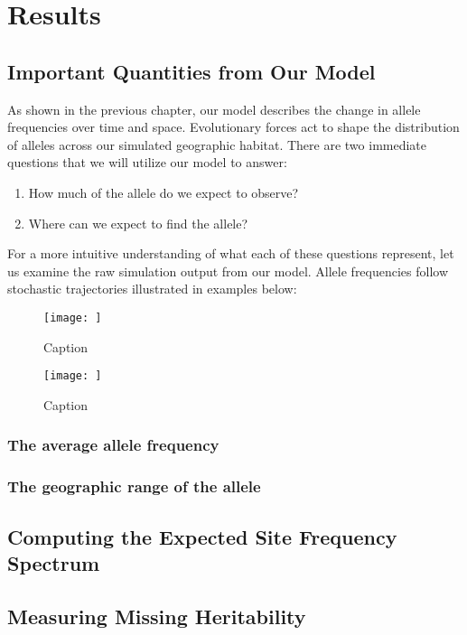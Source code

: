 \chapter{Results}
\section{Important Quantities from Our Model}
As shown in the previous chapter, our model describes the change in allele frequencies over time and space. Evolutionary forces act to shape the distribution of alleles across our simulated geographic habitat. There are two immediate questions that we will utilize our model to answer:

\begin{enumerate}
    \item How much of the allele do we expect to observe?
    \item Where can we expect to find the allele?
\end{enumerate}


For a more intuitive understanding of what each of these questions represent, let us examine the raw simulation output from our model. Allele frequencies follow stochastic trajectories illustrated in examples below:

\begin{figure}[h]
    \centering
    \texttt{[image: ]}
    \caption{Caption}
    \label{fig:time_series}
\end{figure}


\begin{figure}[h]
    \centering
    \texttt{[image: ]}
    \caption{Caption}
    \label{fig:space_series}
\end{figure}


\subsection{The average allele frequency}
 

\subsection{The geographic range of the allele}


\section{Computing the Expected Site Frequency Spectrum}

\section{Measuring Missing Heritability}